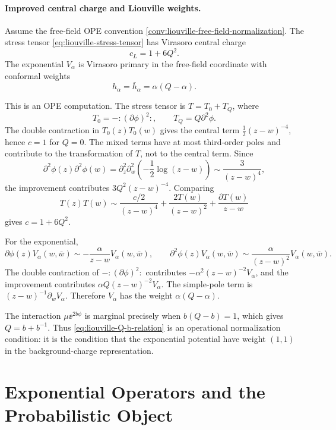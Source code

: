 \paragraph{Improved central charge and Liouville weights.}
Assume the free-field OPE convention
\ref{conv:liouville-free-field-normalization}.  The stress tensor
\eqref{eq:liouville-stress-tensor} has Virasoro central charge
\begin{equation}
  c_L=1+6Q^2.
  \label{eq:liouville-central-charge}
\end{equation}
The exponential \(V_\alpha\) is Virasoro primary in the free-field
coordinate with conformal weights
\begin{equation}
  h_\alpha=\bar h_\alpha=\alpha(Q-\alpha).
  \label{eq:liouville-exponential-weight}
\end{equation}

This is an OPE computation.  The stress tensor is \(T=T_0+T_Q\), where
\[
  T_0=-:\!(\partial\phi)^2\!:,\qquad T_Q=Q\partial^2\phi.
\]
The double contraction in \(T_0(z)T_0(w)\) gives the central term
\(\frac{1}{2}(z-w)^{-4}\), hence \(c=1\) for \(Q=0\).  The mixed terms have
at most third-order poles and contribute to the transformation of \(T\), not
to the central term.  Since
\[
  \partial^2\phi(z)\partial^2\phi(w)
  =
  \partial_z^2\partial_w^2
  \left(-\frac12\log(z-w)\right)
  \sim
  \frac{3}{(z-w)^4},
\]
the improvement contributes \(3Q^2(z-w)^{-4}\).  Comparing
\[
  T(z)T(w)\sim
  \frac{c/2}{(z-w)^4}
  +\frac{2T(w)}{(z-w)^2}
  +\frac{\partial T(w)}{z-w}
\]
gives \(c=1+6Q^2\).

For the exponential,
\[
  \partial\phi(z)V_\alpha(w,\bar w)
  \sim
  -\frac{\alpha}{z-w}V_\alpha(w,\bar w),
  \qquad
  \partial^2\phi(z)V_\alpha(w,\bar w)
  \sim
  \frac{\alpha}{(z-w)^2}V_\alpha(w,\bar w).
\]
The double contraction of \(-:\!(\partial\phi)^2\!:\) contributes
\(-\alpha^2(z-w)^{-2}V_\alpha\), and the improvement contributes
\(\alpha Q(z-w)^{-2}V_\alpha\).  The simple-pole term is
\((z-w)^{-1}\partial_wV_\alpha\).  Therefore \(V_\alpha\) has the weight
\(\alpha(Q-\alpha)\).

The interaction \(\mu\ee^{2b\phi}\) is marginal precisely when
\(b(Q-b)=1\), which gives \(Q=b+b^{-1}\).  Thus
\eqref{eq:liouville-Q-b-relation} is an operational normalization condition:
it is the condition that the exponential potential have weight \((1,1)\) in
the background-charge representation.

\section{Exponential Operators and the Probabilistic Object}

